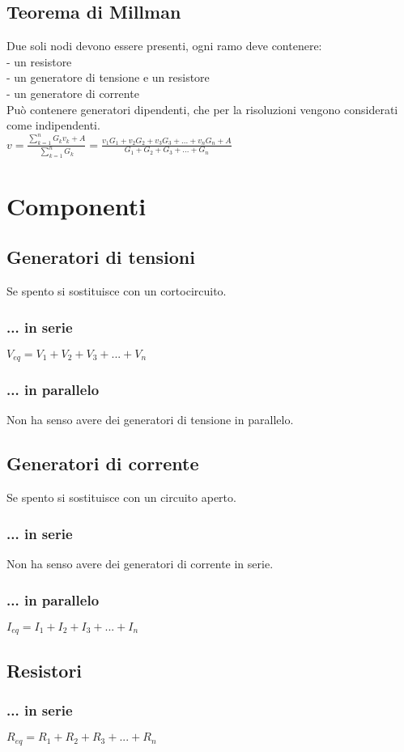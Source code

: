 \documentclass[12pt]{article}
\begin{document}
\subsection{Teorema di Millman}
Due soli nodi devono essere presenti, ogni ramo deve contenere:
\\- un resistore
\\- un generatore di tensione e un resistore
\\- un generatore di corrente
\\Può contenere generatori dipendenti, che per la risoluzioni vengono considerati come indipendenti.
\\$v = \frac{\sum_{k=1}^n G_k v_k + A}{\sum_{k=1}^nG_k} = \frac{v_1G_1+v_2G_2+v_3G_3+...+v_nG_n + A}{G_1+G_2+G_3+...+G_n}$
\section{Componenti}
\subsection{Generatori di tensioni}
Se spento si sostituisce con un cortocircuito.
\subsubsection{... in serie}
$V_{eq} = V_1+V_2+V_3+...+V_n$
\subsubsection{... in parallelo}
Non ha senso avere dei generatori di tensione in parallelo.
\subsection{Generatori di corrente}
Se spento si sostituisce con un circuito aperto.
\subsubsection{... in serie}
Non ha senso avere dei generatori di corrente in serie.
\subsubsection{... in parallelo}
$I_{eq} = I_1+I_2+I_3+...+I_n$
\subsection{Resistori}
\subsubsection{... in serie}
$R_{eq} = R_1 + R_2 + R_3 +...+R_n$
\end{document}
